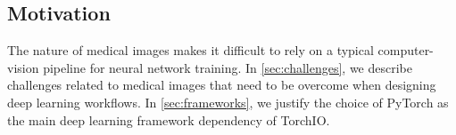 \subsection{Motivation}

The nature of medical images makes it difficult to rely on a typical computer-vision pipeline for neural network training.
In \cref{sec:challenges}, we describe challenges related to medical images that need to be overcome when designing deep learning workflows.
In \cref{sec:frameworks}, we justify the choice of PyTorch as the main deep learning framework dependency of TorchIO.



